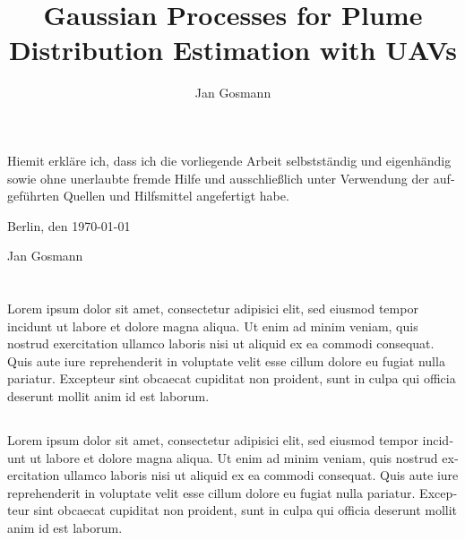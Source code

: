 \documentclass[11pt,a4paper,twoside,BCOR=15mm]{scrbook}
\title{Gaussian Processes for Plume Distribution Estimation with UAVs}
\author{Jan Gosmann}
\begin{document}
\frontmatter
\maketitle %

\thispagestyle{empty}
\begin{german}
    \vspace*{\fill}
    \noindent Hiemit erkläre ich, dass ich die vorliegende Arbeit selbstständig 
    und eigenhändig sowie ohne unerlaubte fremde Hilfe und ausschließlich unter 
    Verwendung der aufgeführten Quellen und Hilfsmittel angefertigt habe.

    \vspace{\intextsep}
    \noindent Berlin, den \today

    \vspace{\intextsep}
    \vspace{\intextsep}
    \noindent Jan Gosmann
    \vspace*{\fill}
    \vspace*{\fill}
\end{german}

\cleardoublepage\thispagestyle{empty}
\vspace*{\fill}
\section*{\abstractname}
Lorem ipsum dolor sit amet, consectetur adipisici elit, sed eiusmod tempor 
incidunt ut labore et dolore magna aliqua. Ut enim ad minim veniam, quis 
nostrud exercitation ullamco laboris nisi ut aliquid ex ea commodi 
consequat. Quis aute iure reprehenderit in voluptate velit esse cillum 
dolore eu fugiat nulla pariatur. Excepteur sint obcaecat cupiditat non 
proident, sunt in culpa qui officia deserunt mollit anim id est laborum.

\begin{german}
\section*{\abstractname}
Lorem ipsum dolor sit amet, consectetur adipisici elit, sed eiusmod tempor 
incidunt ut labore et dolore magna aliqua. Ut enim ad minim veniam, quis 
nostrud exercitation ullamco laboris nisi ut aliquid ex ea commodi 
consequat. Quis aute iure reprehenderit in voluptate velit esse cillum 
dolore eu fugiat nulla pariatur. Excepteur sint obcaecat cupiditat non 
proident, sunt in culpa qui officia deserunt mollit anim id est laborum.
\end{german}
\vspace*{\fill}
\end{document}
